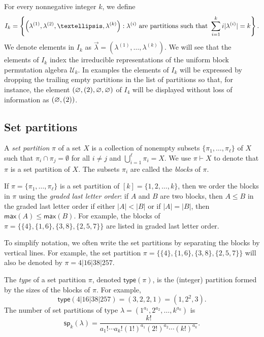 \documentclass[10pt]{amsart}
\theoremstyle{definition}
\theoremstyle{remark}
\newcommand{\defncolor}{\color{darkred}}
\newcommand{\defn}[1]{{\defncolor\emph{#1}}} %
\newcommand{\epart}{\text{\footnotesize$\varnothing$}}
\begin{document}
For every nonnegative integer $k$, we define
\begin{equation}
\label{equation.Ik}
    I_k = \left\{ \left(\lambda^{(1)}, \lambda^{(2)}, \ldots, \lambda^{(k)}\right) : \lambda^{(i)}
    \hbox{ are partitions such that }
    \sum_{i=1}^k i |\lambda^{(i)}| = k \right\}.
\end{equation}
We denote elements in $I_k$ as $\vec{\lambda} = (\lambda^{(1)},\ldots,\lambda^{(k)})$.
We will see that the elements of $I_k$ index the irreducible representations of
the uniform block permutation algebra $\mathcal{U}_k$.  In examples the elements of
$I_k$ will be expressed by dropping the trailing empty partitions in the list of partitions
so that, for instance, the element $(\epart, (2), \epart, \epart)$ of $I_4$ will be displayed
without loss of information as $(\epart, (2))$.

\subsection{Set partitions}
\label{section.set partitions}
A \defn{set partition} $\pi$ of a set $X$ is a collection of nonempty subsets $\{\pi_1, \ldots, \pi_\ell\}$ of $X$ such that
$\pi_i \cap \pi_j = \emptyset$ for all $i \neq j$ and $\bigcup_{i=1}^{\ell} \pi_i = X$.  We use $\pi \vdash X$ to denote that $\pi$
is a set partition of $X$. The subsets $\pi_i$ are called the \defn{blocks} of $\pi$.

If $\pi = \{\pi_1, \ldots, \pi_\ell\}$ is a set partition of $[k] = \{1, 2, \ldots, k\}$,
then we order the blocks in $\pi$ using the \defn{graded last letter order}: if $A$ and $B$ are two blocks, then
$A\leqslant B$ in the graded last letter order if either $|A|<|B|$ or if $|A|=|B|$, then $\mathsf{max}(A)\leqslant \mathsf{max}(B)$.
For example, the blocks of $\pi = \{\{4\}, \{1,6\},\{3,8\},\{2,5,7\}\}$ are listed in graded last letter order.

To simplify notation, we often write the set partitions by separating the blocks by vertical lines. For example, the set partition
$\pi = \{\{4\}, \{1,6\},\{3,8\},\{2,5,7\}\}$ will also be denoted by $\pi = 4|16|38|257$.

The \defn{type} of a set partition $\pi$, denoted $\mathsf{type}(\pi)$,
is the (integer) partition formed by the sizes of the blocks of $\pi$.
For example,
\begin{equation*}
    \mathsf{type}(4|16|38|257) = (3,2,2,1) = (1, 2^2, 3).
\end{equation*}
The number of set partitions of type $\lambda = (1^{a_1}, 2^{a_2}, \ldots, k^{a_k})$ is
\begin{equation}\label{eq:nosetpartitions}
    \mathsf{sp}_k(\lambda) = \frac{k!}{a_1! \cdots a_k!(1!)^{a_1}(2!)^{a_2} \cdots (k!)^{a_k}}.
\end{equation}
\end{document}
